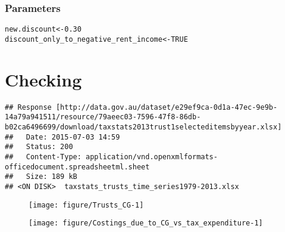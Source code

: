 \documentclass{grattan}\usepackage[]{graphicx}\usepackage[]{color}
\makeatletter
\newcommand{\hlnum}[1]{\textcolor[rgb]{0.686,0.059,0.569}{#1}}%
\newcommand{\hlstd}[1]{\textcolor[rgb]{0.345,0.345,0.345}{#1}}%
\newcommand{\hlkwb}[1]{\textcolor[rgb]{0.69,0.353,0.396}{#1}}%
\newenvironment{kframe}{%
 \def\at@end@of@kframe{}%
 \ifinner\ifhmode%
  \def\at@end@of@kframe{\end{minipage}}%
  \begin{minipage}{\columnwidth}%
 \fi\fi%
 \def\FrameCommand##1{\hskip\@totalleftmargin \hskip-\fboxsep
 \colorbox{shadecolor}{##1}\hskip-\fboxsep
     \hskip-\linewidth \hskip-\@totalleftmargin \hskip\columnwidth}%
 \MakeFramed {\advance\hsize-\width
   \@totalleftmargin\z@ \linewidth\hsize
   \@setminipage}}%
 {\par\unskip\endMakeFramed%
 \at@end@of@kframe}
\newenvironment{knitrout}{}{} %
\makeatother
\begin{document}
\subsection{Parameters}
\begin{knitrout}
\color{fgcolor}\begin{kframe}
\begin{alltt}
\hlstd{new.discount} \hlkwb{<-} \hlnum{0.30}
\hlstd{discount_only_to_negative_rent_income} \hlkwb{<-} \hlnum{TRUE}
\end{alltt}
\end{kframe}
\end{knitrout}





\chapter{Checking}


\begin{knitrout}
\color{fgcolor}\begin{kframe}
\begin{verbatim}
## Response [http://data.gov.au/dataset/e29ef9ca-0d1a-47ec-9e9b-14a79a941511/resource/79aeec03-7596-47f8-86db-b02ca6496699/download/taxstats2013trust1selecteditemsbyyear.xlsx]
##   Date: 2015-07-03 14:59
##   Status: 200
##   Content-Type: application/vnd.openxmlformats-officedocument.spreadsheetml.sheet
##   Size: 189 kB
## <ON DISK>  taxstats_trusts_time_series1979-2013.xlsx
\end{verbatim}
\end{kframe}
\end{knitrout}


\begin{figure}
\texttt{[image: figure/Trusts\_CG-1]}
\notes{}

\end{figure}


\begin{figure}
\texttt{[image: figure/Costings\_due\_to\_CG\_vs\_tax\_expenditure-1]}
\notes{}
\end{figure}
\end{document}
